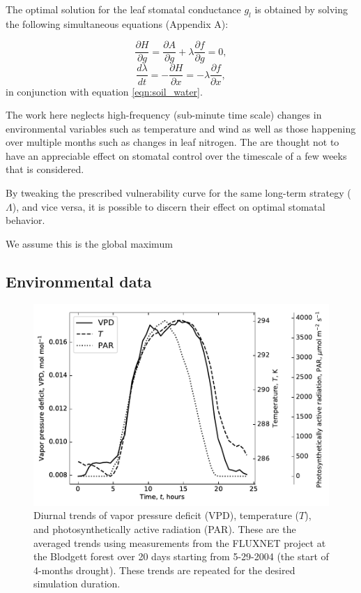 \documentclass[utf8]{frontiersSCNS} %
\begin{document}
The optimal solution for the leaf stomatal conductance $g_l$ is obtained by solving the following simultaneous equations (Appendix A):

\begin{equation}
    \label{eqn: dg}
    \frac{\partial H}{\partial g} = \frac{\partial A}{\partial g} + \lambda \frac{\partial f}{\partial g}=0,
\end{equation}
\begin{equation}
    \label{eqn: dlam}
    \frac{d\lambda}{dt} = - \frac{\partial H}{\partial x} = - \lambda \frac{\partial f}{\partial x},
\end{equation}
in conjunction with equation \ref{eqn:soil_water}.

The work here neglects high-frequency (sub-minute time scale) changes in environmental variables such as temperature and wind as well as those happening over multiple months such as changes in leaf nitrogen. The are thought not to have an appreciable effect on stomatal control over the timescale of a few weeks that is considered.

By tweaking the prescribed vulnerability curve for the same long-term strategy ($\Lambda$), and vice versa, it is possible to discern their effect on optimal stomatal behavior. 

We assume this is the global maximum

\subsection{Environmental data} 

\begin{figure}
    \begin{center}
         \includegraphics[scale=0.75]{Fig1.pdf}   
    \end{center}
    \caption{Diurnal trends of vapor pressure deficit (VPD), temperature ($T$), and photosynthetically active radiation (PAR). These are the averaged trends using measurements from the FLUXNET project at the Blodgett forest over 20 days starting from 5-29-2004 (the start of 4-months drought). These trends are repeated for the desired simulation duration.}
    \label{fig:environment}
\end{figure}
\end{document}
